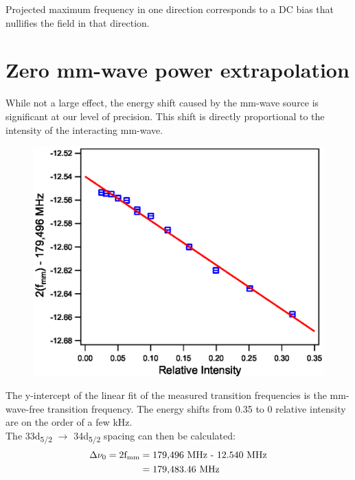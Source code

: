 \documentclass[landscape]{sciposter}
\begin{document}
\begin{multicols}{4}
Projected maximum frequency in one direction corresponds to a DC bias that nullifies the field in that direction.

\section*{\large Zero mm-wave power extrapolation}
While not a large effect, the energy shift caused by the mm-wave source is significant at our level of precision. This shift is directly proportional to the intensity of the interacting mm-wave. 

\begin{figure}
\begin{center}
\includegraphics[scale = 0.9]{33d52_PScans.eps}
\caption{}
\label{Power}
\end{center}
\end{figure}

The y-intercept of the linear fit of the measured transition frequencies is the mm-wave-free transition frequency. The energy shifts from 0.35 to 0 relative intensity are on the order of a few kHz.\\

The 33d\textsubscript{5/2} $\rightarrow$ 34d\textsubscript{5/2} spacing can then be calculated:
\begin{align*}
\Delta \nu_0 = \textrm{2f\textsubscript{mm}} &= \textrm{179,496 MHz - 12.540 MHz} \\ &= \textrm{179,483.46 MHz}
\end{align*}




\end{multicols}
\end{document}
